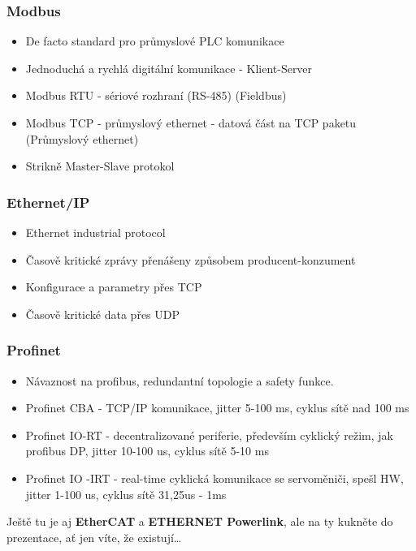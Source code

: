 \subsubsection*{Modbus}
\begin{itemize}
    \item De facto standard pro průmyslové PLC komunikace
    \item Jednoduchá a rychlá digitální komunikace - Klient-Server
    \item Modbus RTU - sériové rozhraní (RS-485) (Fieldbus)
    \item Modbus TCP - průmyslový ethernet - datová část na TCP paketu (Průmyslový ethernet)
    \item Strikně Master-Slave protokol
\end{itemize}

\subsubsection*{Ethernet/IP}
\begin{itemize}
    \item Ethernet industrial protocol
    \item Časově kritické zprávy přenášeny způsobem producent-konzument
    \item Konfigurace a parametry přes TCP
    \item Časově kritické data přes UDP
\end{itemize}

\subsubsection*{Profinet}
\begin{itemize}
    \item Návaznost na profibus, redundantní topologie a safety funkce.
    \item Profinet CBA - TCP/IP komunikace, jitter 5-100 ms, cyklus sítě nad 100 ms
    \item Profinet IO-RT - decentralizované periferie, především cyklický režim, jak profibus DP, jitter 10-100 us, cyklus sítě 5-10 ms
    \item Profinet IO -IRT - real-time cyklická komunikace se servoměniči, spešl HW, jitter 1-100 us, cyklus sítě 31,25us - 1ms
\end{itemize}

Ještě tu je aj \textbf{EtherCAT} a \textbf{ETHERNET Powerlink}, ale na ty kukněte do prezentace, ať jen víte, že existují\dots


